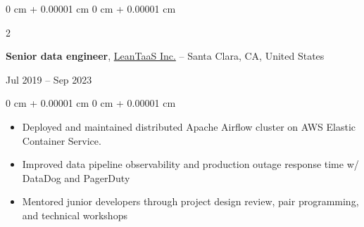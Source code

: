 \documentclass[10pt, letterpaper]{article}
\newenvironment{highlights}{
    \begin{itemize}[
        topsep=0.10 cm,
        parsep=0.10 cm,
        partopsep=0pt,
        itemsep=0pt,
        leftmargin=0 cm + 10pt
    ]
}{
    \end{itemize}
} %
\newenvironment{onecolentry}{
    \begin{adjustwidth}{
        0 cm + 0.00001 cm
    }{
        0 cm + 0.00001 cm
    }
}{
    \end{adjustwidth}
} %
\newenvironment{twocolentry}[2][]{
    \onecolentry
    \def\secondColumn{#2}
    \setcolumnwidth{\fill, 4.5 cm}
    \begin{paracol}{2}
}{
    \switchcolumn \raggedleft \secondColumn
    \end{paracol}
    \endonecolentry
} %
\begin{document}
        \begin{twocolentry}{
            Jul 2019 -- Sep 2023
        }
            \textbf{Senior data engineer}, \href{https://www.leantaas.com}{LeanTaaS Inc.} -- Santa Clara, CA, United States
        \end{twocolentry}
        \vspace{0.10 cm}
        \begin{onecolentry}
            \begin{highlights}
                \item Deployed and maintained distributed Apache Airflow cluster on AWS Elastic Container Service.
                \item Improved data pipeline observability and production outage response time w/ DataDog and PagerDuty
                \item Mentored junior developers through project design review, pair programming, and technical workshops
            \end{highlights}
        \end{onecolentry}
        \vspace{0.2 cm}

    

            
\end{document}
